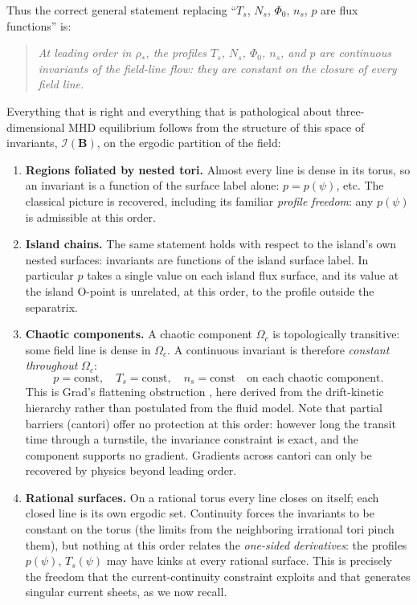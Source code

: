\documentclass[english]{article}
\newcommand{\bB}{\mathbf{B}}
\begin{document}
Thus the correct general statement replacing ``$T_s$, $N_s$, $\Phi_0$, $n_s$, $p$ are flux
functions'' is:
\begin{quote}
\emph{At leading order in $\rho_*$, the profiles $T_s$, $N_s$, $\Phi_0$, $n_s$, and $p$ are
continuous invariants of the field-line flow: they are constant on the closure of every field
line.}
\end{quote}
Everything that is right and everything that is pathological about three-dimensional MHD
equilibrium follows from the structure of this space of invariants, $\mathcal{I}(\bB)$, on the
ergodic partition of the field:
\begin{enumerate}
\item \textbf{Regions foliated by nested tori.} Almost every line is dense in its torus, so an
invariant is a function of the surface label alone: $p=p(\psi)$, etc. The classical picture is
recovered, including its familiar \emph{profile freedom}: any $p(\psi)$ is admissible at this
order.
\item \textbf{Island chains.} The same statement holds with respect to the island's own nested
surfaces: invariants are functions of the island surface label. In particular $p$ takes a single
value on each island flux surface, and its value at the island O-point is unrelated, at this order,
to the profile outside the separatrix.
\item \textbf{Chaotic components.} A chaotic component $\Omega_c$ is topologically transitive: some
field line is dense in $\Omega_c$. A continuous invariant is therefore \emph{constant throughout}
$\Omega_c$:
\begin{equation}
p=\text{const},\quad T_s=\text{const},\quad n_s=\text{const}\quad\text{on each chaotic component.}
\label{eq:flattening}
\end{equation}
This is Grad's flattening obstruction \cite{grad1967}, here derived from the drift-kinetic
hierarchy rather than postulated from the fluid model. Note that partial barriers (cantori) offer
no protection at this order: however long the transit time through a turnstile, the invariance
constraint is exact, and the component supports no gradient. Gradients across cantori can only be
recovered by physics beyond leading order.
\item \textbf{Rational surfaces.} On a rational torus every line closes on itself; each closed line
is its own ergodic set. Continuity forces the invariants to be constant on the torus (the limits
from the neighboring irrational tori pinch them), but nothing at this order relates the
\emph{one-sided derivatives}: the profiles $p(\psi)$, $T_s(\psi)$ may have kinks at every rational
surface. This is precisely the freedom that the current-continuity constraint exploits and that
generates singular current sheets, as we now recall.
\end{enumerate}
\end{document}
